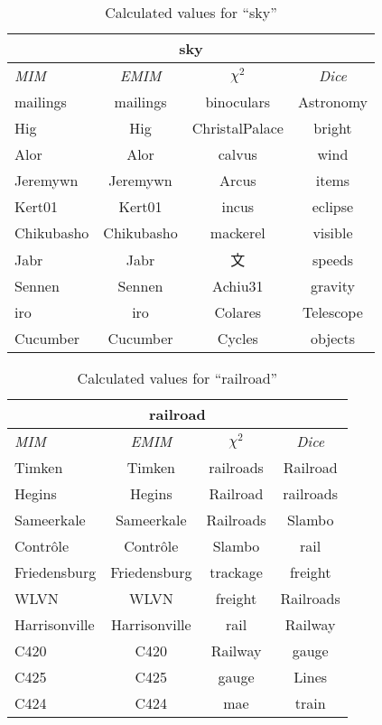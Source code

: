 \begin{table}[h!]
\centering
\begin{tabular}{ l | c | c | c }
\hline
\multicolumn{4}{c}{sky}\\
\hline
\textit{MIM} & \textit{EMIM} & \textit{\(\chi^2\)} & \textit{Dice}\\
\hline
mailings & mailings & binoculars & Astronomy\\
Hig & Hig & ChristalPalace & bright\\
Alor & Alor & calvus & wind\\
Jeremywn & Jeremywn & Arcus & items\\
Kert01 & Kert01 & incus & eclipse\\
Chikubasho & Chikubasho & mackerel & visible\\
Jabr & Jabr & 文 & speeds\\
Sennen & Sennen & Achiu31 & gravity\\
iro & iro & Colares & Telescope\\
Cucumber & Cucumber & Cycles & objects\\
\hline
\end{tabular}
\caption{Calculated values for ``sky''}
\label{tab:words}
\end{table}
\begin{table}[h!]
\centering
\begin{tabular}{ l | c | c | c }
\hline
\multicolumn{4}{c}{railroad}\\
\hline
\textit{MIM} & \textit{EMIM} & \textit{\(\chi^2\)} & \textit{Dice}\\
\hline
Timken & Timken & railroads & Railroad\\
Hegins & Hegins & Railroad & railroads\\
Sameerkale & Sameerkale & Railroads & Slambo\\
Contrôle & Contrôle & Slambo & rail\\
Friedensburg & Friedensburg & trackage & freight\\
WLVN & WLVN & freight & Railroads\\
Harrisonville & Harrisonville & rail & Railway\\
C420 & C420 & Railway & gauge\\
C425 & C425 & gauge & Lines\\
C424 & C424 & mae & train\\
\hline
\end{tabular}
\caption{Calculated values for ``railroad''}
\label{tab:words}
\end{table}
